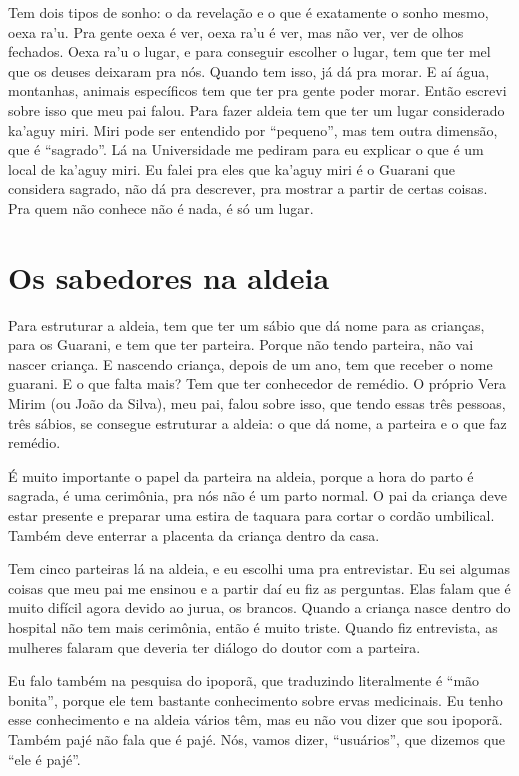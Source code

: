 Tem dois tipos de sonho: o da revelação e o que é exatamente o sonho
mesmo, oexa ra’u. Pra gente oexa é ver, oexa ra’u é ver, mas não ver,
ver de olhos fechados. Oexa ra’u o lugar, e para conseguir escolher o
lugar, tem que ter mel que os deuses deixaram pra nós. Quando tem isso,
já dá pra morar. E aí água, montanhas, animais específicos tem que ter
pra gente poder morar. Então escrevi sobre isso que meu pai falou. Para
fazer aldeia tem que ter um lugar considerado ka’aguy miri. Miri pode ser
entendido por ``pequeno'', mas tem outra dimensão, que é ``sagrado''.
Lá na Universidade me pediram para eu explicar o que é um local de ka’aguy
miri. Eu falei pra eles que ka’aguy miri é o Guarani que considera sagrado, não dá pra descrever, pra mostrar a partir de certas coisas.
Pra quem não conhece não é nada, é só um lugar.

\section{Os sabedores na aldeia}

Para estruturar a aldeia, tem que ter um sábio que dá nome para as
crianças, para os Guarani, e tem que ter parteira. Porque não tendo
parteira, não vai nascer criança. E nascendo criança, depois de um ano,
tem que receber o nome guarani. E o que falta mais? Tem que ter
conhecedor de remédio. O próprio Vera Mirim (ou João da Silva), meu
pai, falou sobre isso, que tendo essas três pessoas, três sábios, se
consegue estruturar a aldeia: o que dá nome, a parteira e o que faz
remédio.

É muito importante o papel da parteira na aldeia, porque a hora do parto
é sagrada, é uma cerimônia, pra nós não é um parto normal. O pai da
criança deve estar presente e preparar uma estira de taquara para
cortar o cordão umbilical. Também deve enterrar a placenta da criança
dentro da casa.

Tem cinco parteiras lá na aldeia, e eu escolhi uma pra entrevistar. Eu
sei algumas coisas que meu pai me ensinou e a partir daí eu fiz as
perguntas. Elas falam que é muito difícil agora devido ao jurua, os
brancos. Quando a criança nasce dentro do hospital não tem mais
cerimônia, então é muito triste. Quando fiz entrevista, as mulheres
falaram que deveria ter diálogo do doutor com a parteira. 

Eu falo também na pesquisa do ipoporã, que traduzindo literalmente é
``mão bonita'', porque ele tem bastante conhecimento sobre ervas
medicinais. Eu tenho esse conhecimento e na aldeia vários têm, mas eu
não vou dizer que sou ipoporã. Também pajé não fala que é pajé. Nós,
vamos dizer, ``usuários'', que dizemos que ``ele é pajé''.

